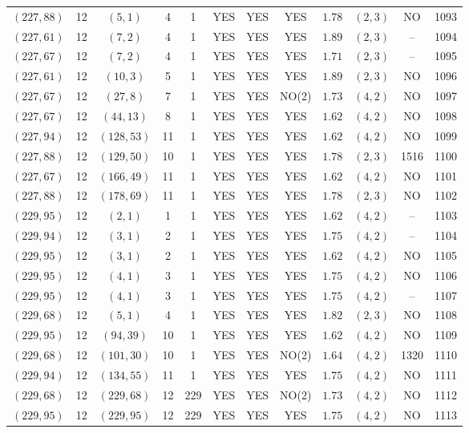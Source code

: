 \begin{longtable}{|c|c|c|c|c|c|c|c|c|c|c|c|}
$(227,88)$ & 12 & $(5,1)$ & 4 & 1 & YES & YES & YES & $1.78$ & $(2,3)$ & NO & 1093\\
$(227,61)$ & 12 & $(7,2)$ & 4 & 1 & YES & YES & YES & $1.89$ & $(2,3)$ & -- & 1094\\
$(227,67)$ & 12 & $(7,2)$ & 4 & 1 & YES & YES & YES & $1.71$ & $(2,3)$ & -- & 1095\\
$(227,61)$ & 12 & $(10,3)$ & 5 & 1 & YES & YES & YES & $1.89$ & $(2,3)$ & NO & 1096\\
$(227,67)$ & 12 & $(27,8)$ & 7 & 1 & YES & YES & NO(2) & $1.73$ & $(4,2)$ & NO & 1097\\
$(227,67)$ & 12 & $(44,13)$ & 8 & 1 & YES & YES & YES & $1.62$ & $(4,2)$ & NO & 1098\\
$(227,94)$ & 12 & $(128,53)$ & 11 & 1 & YES & YES & YES & $1.62$ & $(4,2)$ & NO & 1099\\
$(227,88)$ & 12 & $(129,50)$ & 10 & 1 & YES & YES & YES & $1.78$ & $(2,3)$ & 1516 & 1100\\
$(227,67)$ & 12 & $(166,49)$ & 11 & 1 & YES & YES & YES & $1.62$ & $(4,2)$ & NO & 1101\\
$(227,88)$ & 12 & $(178,69)$ & 11 & 1 & YES & YES & YES & $1.78$ & $(2,3)$ & NO & 1102\\
$(229,95)$ & 12 & $(2,1)$ & 1 & 1 & YES & YES & YES & $1.62$ & $(4,2)$ & -- & 1103\\
$(229,94)$ & 12 & $(3,1)$ & 2 & 1 & YES & YES & YES & $1.75$ & $(4,2)$ & -- & 1104\\
$(229,95)$ & 12 & $(3,1)$ & 2 & 1 & YES & YES & YES & $1.62$ & $(4,2)$ & NO & 1105\\
$(229,95)$ & 12 & $(4,1)$ & 3 & 1 & YES & YES & YES & $1.75$ & $(4,2)$ & NO & 1106\\
$(229,95)$ & 12 & $(4,1)$ & 3 & 1 & YES & YES & YES & $1.75$ & $(4,2)$ & -- & 1107\\
$(229,68)$ & 12 & $(5,1)$ & 4 & 1 & YES & YES & YES & $1.82$ & $(2,3)$ & NO & 1108\\
$(229,95)$ & 12 & $(94,39)$ & 10 & 1 & YES & YES & YES & $1.62$ & $(4,2)$ & NO & 1109\\
$(229,68)$ & 12 & $(101,30)$ & 10 & 1 & YES & YES & NO(2) & $1.64$ & $(4,2)$ & 1320 & 1110\\
$(229,94)$ & 12 & $(134,55)$ & 11 & 1 & YES & YES & YES & $1.75$ & $(4,2)$ & NO & 1111\\
$(229,68)$ & 12 & $(229,68)$ & 12 & 229 & YES & YES & NO(2) & $1.73$ & $(4,2)$ & NO & 1112\\
$(229,95)$ & 12 & $(229,95)$ & 12 & 229 & YES & YES & YES & $1.75$ & $(4,2)$ & NO & 1113\\

\end{longtable}
